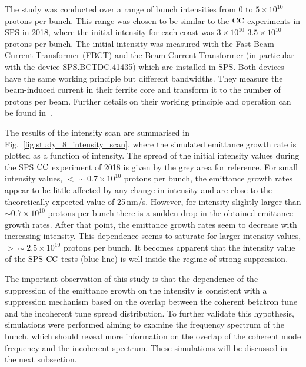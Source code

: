  The study was conducted over a range of bunch intensities from 0 to $5 \times 10^{10}$ protons per bunch. This range was chosen to be similar to the ${\mathrm{CC}}$ experiments in SPS in 2018, where the initial intensity for each coast was $3 \times 10^{10}$-$3.5 \times 10^{10}$ protons per bunch. The initial intensity was measured with the Fast Beam Current Transformer (FBCT) and the Beam Current Transformer (in particular with the device SPS.BCTDC.41435) which are installed in SPS. Both devices have the same working principle but different bandwidths. They measure the beam-induced current in their ferrite core and transform it to the number of protons per beam. Further details on their working principle and operation can be found in~\cite{Jones:1982418, Jakob:624188}.

 The results of the intensity scan are summarised in Fig.~\ref{fig:study_8_intensity_scan}, where the simulated emittance growth rate is plotted as a function of intensity. The spread of the initial intensity values during the SPS ${\mathrm{CC}}$ experiment of 2018 is given by the grey area for reference. For small intensity values, $< \sim 0.7\times 10^{10}$ protons per bunch, the emittance growth rates appear to be little affected by any change in intensity and are close to the theoretically expected value of 25\,nm/s. However, for intensity slightly larger than $\sim 0.7 \times 10^{10}$ protons per bunch there is a sudden drop in the obtained emittance growth rates. After that point, the emittance growth rates seem to decrease with increasing intensity. This dependence seems to saturate for larger intensity values, $>\sim 2.5 \times 10^{10}$ protons per bunch. It becomes apparent that the intensity value of the SPS ${\mathrm{CC}}$ tests (blue line) is well inside the regime of strong suppression.

The important observation of this study is that the dependence of the suppression of the emittance growth on the intensity is consistent with a suppression mechanism based on the overlap between the coherent betatron tune and the incoherent tune spread distribution. To further validate this hypothesis, simulations were performed aiming to examine the frequency spectrum of the bunch, which should reveal more information on the overlap of the coherent mode frequency and the incoherent spectrum. These simulations will be discussed in the next subsection.


